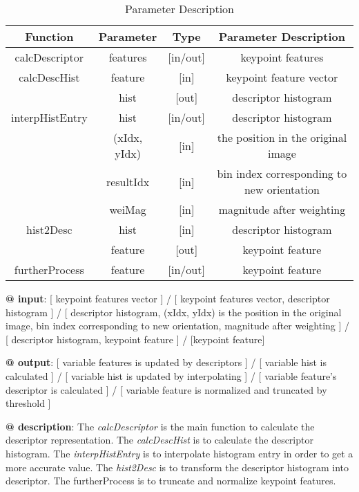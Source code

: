 \documentclass[paper=a4, fontsize=11pt]{scrartcl} %
\numberwithin{equation}{section} %
\numberwithin{figure}{section} %
\numberwithin{table}{section} %
\begin{document}
\begin{table}[h]
    \centering
    \begin{tabular}{|c|c|c|c|}
        \hline
        \textbf{Function} & \textbf{Parameter} & \textbf{Type} & \textbf{Parameter Description} \\\hline
        calcDescriptor & features & [in/out] & keypoint features \\\hline
        calcDescHist & feature & [in] & keypoint feature vector \\
            & hist & [out] & descriptor histogram\\\hline
        interpHistEntry & hist & [in/out] & descriptor histogram \\
        & (xIdx, yIdx)& [in] & the position in the original image \\
        & resultIdx & [in] & bin index corresponding to new orientation\\
                        & weiMag & [in] & magnitude after weighting \\\hline

        hist2Desc & hist & [in] & descriptor histogram \\
                  & feature  & [out] & keypoint feature  \\\hline
        furtherProcess & feature & [in/out] & keypoint feature \\\hline
    \end{tabular}
    \caption{Parameter Description}\label{nolock}
\end{table}

\textbf{@ input}: [ keypoint features vector ] / [ keypoint features vector, descriptor histogram ] / [ descriptor histogram, (xIdx, yIdx) is the position in the original image, bin index corresponding to new orientation, magnitude after weighting ] / [ descriptor histogram, keypoint feature ] / [keypoint feature] 

\textbf{@ output}: [ variable features is updated by descriptors ] / [ variable hist is calculated ] / [ variable hist is updated by interpolating ] / [ variable feature’s descriptor is calculated ] / [ variable feature is normalized and truncated by threshold ]

\textbf{@ description}: The \textsl{calcDescriptor} is the main function to calculate the descriptor representation. The \textsl{calcDescHist} is to calculate the descriptor histogram. The \textsl{interpHistEntry} is to interpolate histogram entry in order to get a more accurate value. The \textsl{hist2Desc} is to transform the descriptor histogram into descriptor. The furtherProcess is to truncate and normalize keypoint features.
\end{document}
